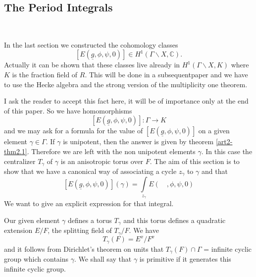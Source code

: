 \setcounter{section}{3}
\setcounter{subsection}{0}
\subsection{The Period Integrals}\label{art2-sec3.1}
~

In the last section we constructed the cohomology classes 
$$
[E(\underline{g},\phi,\psi,0)]\in H^{1}(\Gamma\backslash X,\mathbb{C}).
$$ 
Actually it can be shown that these classes live already in $H^{1}(\Gamma\backslash X,K)$ where $K$ is the fraction field of $R$. This will be done in a subsequent\pageoriginale paper and we have to use the Hecke algebra and the strong version of the multiplicity one theorem.

I ask the reader to accept this fact here, it will be of importance only at the end of this paper. So we have homomorphisms
$$
[E(\underline{g},\phi,\psi,0)]:\Gamma\to K
$$
and we may ask for a formula for the value of $[E(\underline{g},\phi,\psi,0)]$ on a given element $\gamma\in \Gamma$. If $\gamma$ is unipotent, then the answer is given by theorem \ref{art2-thm2.1}. Therefore we are left with the non unipotent elements $\gamma$. In this case the centralizer $T_{\gamma}$ of $\gamma$ is an anisotropic torus over $F$. The aim of this section is to show that we have a canonical way of associating a cycle $z_{\gamma}$ to $\gamma$ and that
$$
[E(\underline{g},\phi,\psi,0)](\gamma)=\int\limits_{z_{\gamma}}E(\quad,\phi,\psi,0)
$$
We want to give an explicit expression for that integral.

Our given element $\gamma$ defines a torus $T_{\gamma}$ and this torus defines a quadratic extension $E/F$, the splitting field of $T_{\gamma}/F$. We have
$$
T_{\gamma}(F)=E^{x}/F^{x}
$$
and it follows from Dirichlet's theorem on units that $T_{\gamma}(F)\cap \Gamma$ = infinite cyclic group which contains $\gamma$. We shall say that $\gamma$ is primitive if it generates this infinite cyclic group.

